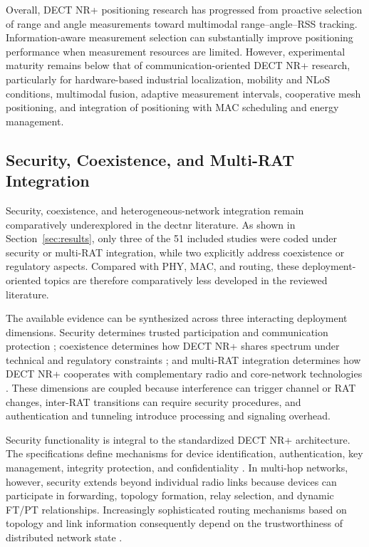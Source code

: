 Overall, DECT NR+ positioning research has progressed from proactive selection
of range and angle measurements toward multimodal range--angle--RSS tracking.
Information-aware measurement selection can substantially improve positioning
performance when measurement resources are limited. However, experimental
maturity remains below that of communication-oriented DECT NR+ research,
particularly for hardware-based industrial localization, mobility and NLoS
conditions, multimodal fusion, adaptive measurement intervals, cooperative
mesh positioning, and integration of positioning with MAC scheduling and
energy management.


\subsection{Security, Coexistence, and Multi-RAT Integration}
\label{subsec:security_coexistence}

Security, coexistence, and heterogeneous-network integration remain
comparatively underexplored in the \gls{dectnr} literature. As shown in
Section~\ref{sec:results}, only three of the 51 included studies were coded
under security or multi-RAT integration, while two explicitly address
coexistence or regulatory aspects. Compared with PHY, MAC, and routing, these
deployment-oriented topics are therefore comparatively less developed in the
reviewed literature.

The available evidence can be synthesized across three interacting deployment
dimensions. Security determines trusted participation and communication
protection
\cite{etsi_ts103636_4,etsi_ts103636_5};
coexistence determines how DECT NR+ shares spectrum under technical and
regulatory constraints
\cite{samuylovPerformanceAssessmentDECT20202023,
samuylovPerformanceDECT2020NR2025}; and multi-RAT integration determines how
DECT NR+ cooperates with complementary radio and core-network technologies
\cite{dangEWDCIntegratingDECT20202025a,
dangUniRATUnifiedDECT20202026}. These dimensions are coupled because
interference can trigger channel or RAT changes, inter-RAT transitions can
require security procedures, and authentication and tunneling introduce
processing and signaling overhead.

Security functionality is integral to the standardized DECT NR+ architecture.
The specifications define mechanisms for device identification,
authentication, key management, integrity protection, and confidentiality
\cite{etsi_ts103636_4,etsi_ts103636_5}. In multi-hop networks, however,
security extends beyond individual radio links because devices can participate
in forwarding, topology formation, relay selection, and dynamic FT/PT
relationships. Increasingly sophisticated routing mechanisms based on topology
and link information consequently depend on the trustworthiness of distributed
network state
\cite{fuhrlingRobustRoutingProtocol2025b,
rauwolfTopologyAwareDeepReinforcement2026a}.

